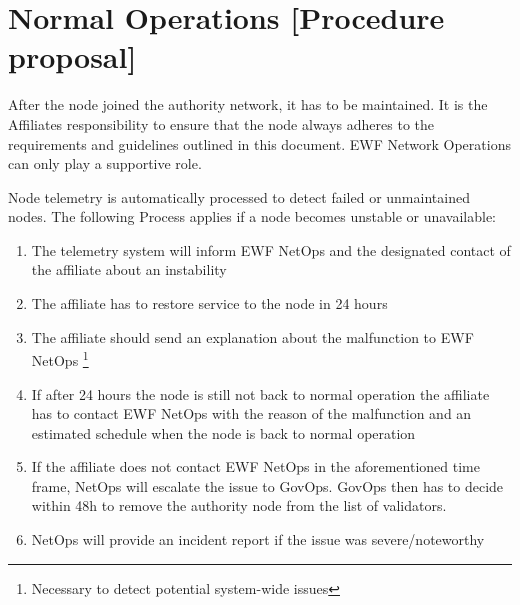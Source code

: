 
\section{Normal Operations [Procedure proposal]}

After the node joined the authority network, it has to be maintained. It is the Affiliates responsibility to ensure that the node always adheres to the requirements and guidelines outlined in this document.
EWF Network Operations can only play a supportive role.

Node telemetry is automatically processed to detect failed or unmaintained nodes. The following Process applies if a node becomes unstable or unavailable:

\begin{enumerate}
    \item The telemetry system will inform EWF NetOps and the designated contact of the affiliate about an instability
    \item The affiliate has to restore service to the node in 24 hours
    \item The affiliate should send an explanation about the malfunction to EWF NetOps \footnote{Necessary to detect potential system-wide issues}
    \item If after 24 hours the node is still not back to normal operation the affiliate has to contact EWF NetOps with the reason of the malfunction and an estimated schedule when the node is back to normal operation
    \item If the affiliate does not contact EWF NetOps in the aforementioned time frame, NetOps will escalate the issue to GovOps. GovOps then has to decide within 48h to remove the authority node from the list of validators.
    \item NetOps will provide an incident report if the issue was severe/noteworthy
\end{enumerate}
